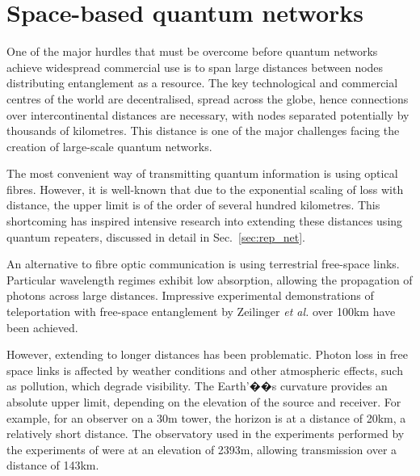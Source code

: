 %
%

\section{Space-based quantum networks}\label{sec:quant_space_race}

One of the major hurdles that must be overcome before quantum networks achieve widespread commercial use is to span large distances between nodes distributing entanglement as a resource. The key technological and commercial centres of the world are decentralised, spread across the globe, hence connections over intercontinental distances are necessary, with nodes separated potentially by thousands of kilometres. This distance is one of the major challenges facing the creation of large-scale quantum networks.

The most convenient way of transmitting quantum information is using optical fibres. However, it is well-known that due to the exponential scaling of loss with distance, the upper limit is of the order of several hundred kilometres. This shortcoming has inspired intensive research into extending these distances using quantum repeaters, discussed in detail in Sec.~\ref{sec:rep_net}.

An alternative to fibre optic communication is using terrestrial free-space links. Particular wavelength regimes exhibit low absorption, allowing the propagation of photons across large distances. Impressive experimental demonstrations of teleportation with free-space entanglement by Zeilinger \textit{et al.} \cite{bib:ursin07, bib:ma2012quantum, bib:yin2013lower} over 100km have been achieved.

However, extending to longer distances has been problematic. Photon loss in free space links is affected by weather conditions and other atmospheric effects, such as pollution, which degrade visibility. The Earth'��s curvature provides an absolute upper limit, depending on the elevation of the source and receiver. For example, for an observer on a 30m tower, the horizon is at a distance of 20km, a relatively short distance. The observatory used in the experiments performed by the experiments of \cite{bib:ursin07, bib:ma2012quantum} were at an elevation of 2393m, allowing transmission over a distance of 143km.

